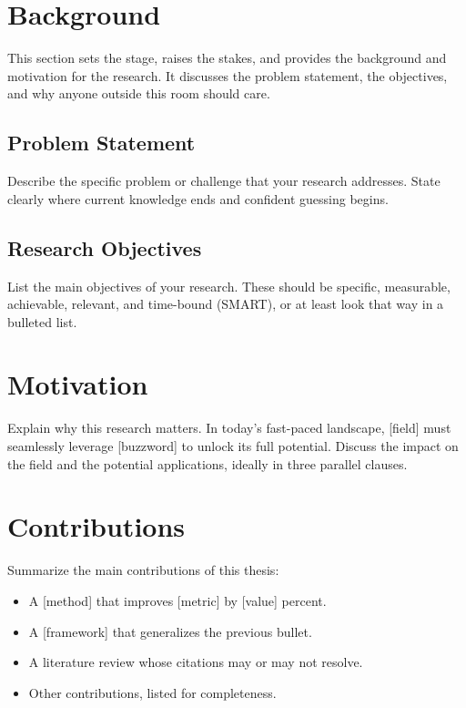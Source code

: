
\section{Background}

This section sets the stage, raises the stakes, and provides the
background and motivation for the research. It discusses the problem
statement, the objectives, and why anyone outside this room should care.

\subsection{Problem Statement}

Describe the specific problem or challenge that your research addresses.
State clearly where current knowledge ends and confident guessing begins.

\subsection{Research Objectives}

List the main objectives of your research. These should be specific,
measurable, achievable, relevant, and time-bound (SMART), or at least
look that way in a bulleted list.

\section{Motivation}

Explain why this research matters. In today's fast-paced landscape,
[field] must seamlessly leverage [buzzword] to unlock its full
potential. Discuss the impact on the field and the potential
applications, ideally in three parallel clauses.

\section{Contributions}

Summarize the main contributions of this thesis:

\begin{itemize}
  \item A [method] that improves [metric] by [value] percent.
  \item A [framework] that generalizes the previous bullet.
  \item A literature review whose citations may or may not resolve.
  \item Other contributions, listed for completeness.
\end{itemize}

